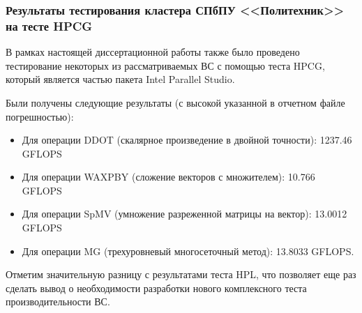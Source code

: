 
\subsubsection{Результаты тестирования кластера СПбПУ <<Политехник>> на тесте HPCG}

В рамках настоящей диссертационной работы также было проведено тестирование некоторых из рассматриваемых ВС с помощью теста HPCG, который является частью пакета Intel Parallel Studio. 


Были получены следующие результаты (с высокой указанной в отчетном файле погрешностью):
\begin{itemize}
\item Для операции DDOT (скалярное произведение в двойной точности): 1237.46 GFLOPS
\item Для операции WAXPBY (сложение векторов с множителем): 10.766 GFLOPS
\item Для операции SpMV (умножение разреженной матрицы на вектор): 13.0012  GFLOPS
\item Для операции MG (трехуровневый многосеточный метод): 13.8033 GFLOPS.
\end{itemize}

Отметим значительную разницу с результатами теста HPL, что позволяет еще раз сделать вывод о необходимости разработки нового комплексного теста производительности ВС.
